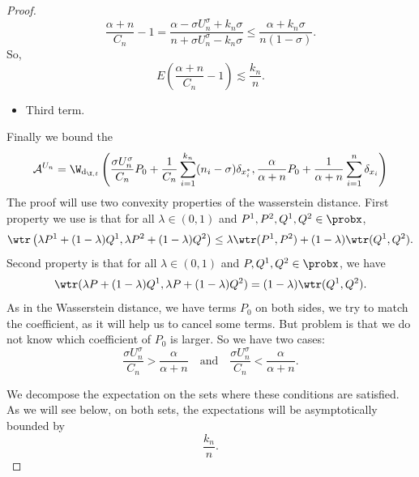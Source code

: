 \begin{proof}
    
    \[
    \frac{\alpha + n}{C_n} - 1 = \frac{\alpha -  \sigma U_n^\sigma + k_n \sigma}{n +  \sigma U_n^\sigma - k_n \sigma}\leq
    \frac{\alpha + k_n \sigma}{n(1- \sigma)}.
    \]
    So,
    \[
    E \left(\frac{\alpha + n}{C_n} - 1\right) \lesssim \frac{k_n}{n}.
    \]
    \begin{itemize}
        \item Third term.
    \end{itemize}
    Finally we bound the
    \[
    \mathcal{A}^{U_n} = \W_{\mathrm{d}_{\X,t}} \left( \frac{ \sigma U_n^\sigma}{C_n}P_0 + \frac{1}{C_n}\sum_{i = 1}^{k_n}(n_i - \sigma)\delta_{x_i^*}, \frac{\alpha}{\alpha + n}P_0 + \frac{1}{\alpha + n}\sum_{i = 1}^n \delta_{x_i}\right)
    \]
    The proof will use two convexity properties of the wasserstein distance. First property we use is that for all $\lambda \in (0,1)$ and $P^1,P^2,Q^1,Q^2 \in \probx$,
    \[
    \wtr\left( \lambda P^1 + (1-\lambda)Q^1, \lambda P^2 + (1-\lambda)Q^2 \right) \leq \lambda \wtr(P^1,P^2) + (1-\lambda)\wtr(Q^1,Q^2).
    \]
    Second property is that for all $\lambda \in (0,1)$ and $P,Q^1,Q^2 \in \probx$, we have 
    \[
    \wtr (\lambda  P + (1-\lambda)Q^1, \lambda P + (1-\lambda)Q^2) = (1-\lambda)\wtr(Q^1,Q^2).
    \]
    As in the Wasserstein distance, we have terms $P_0$ on both sides, we try to match the coefficient, as it will help us to cancel some terms. But problem is that we do not know which coefficient of $P_0$ is larger. So we have two cases:
    \[
    \frac{ \sigma U_n^\sigma}{C_n} > \frac{\alpha}{\alpha + n} \quad \text{and} \quad 
    \frac{ \sigma U_n^\sigma}{C_n} < \frac{\alpha}{\alpha + n}.
    \]
 
    We decompose the expectation on the sets where these conditions are satisfied. As we will see below, on both sets, the expectations will be asymptotically bounded by 
    \[
    \frac{k_n}{n}.
    \]


\end{proof}
